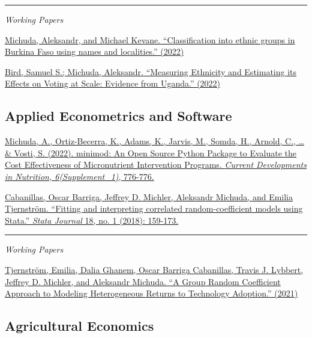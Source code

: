 \documentclass[
  11pt]{article}
\begin{document}
\begin{center}\rule{0.5\linewidth}{0.5pt}\end{center}

\emph{Working Papers}

\href{https://drive.google.com/file/d/1ZCS0c89GkS4hio5WEUrMSnqJ1FYeMd0V/view?usp=sharing}{Michuda,
Aleksandr, and Michael Kevane. ``Classification into ethnic groups in
Burkina Faso using names and localities.'' (2022)}

\href{https://drive.google.com/file/d/1Tdmr2_4DCSXIt_Q7tq1omglsgn249VgE/view?usp=sharing}{Bird,
Samuel S.; Michuda, Aleksandr. ``Measuring Ethnicity and Estimating its
Effects on Voting at Scale: Evidence from Uganda.'' (2022)}

\hypertarget{applied-econometrics-and-software}{%
\subsection{Applied Econometrics and
Software}\label{applied-econometrics-and-software}}

\href{https://academic.oup.com/cdn/article/6/Supplement_1/776/6606969}{Michuda,
A., Ortiz-Becerra, K., Adams, K., Jarvis, M., Somda, H., Arnold, C.,
\ldots{} \& Vosti, S. (2022). minimod: An Open Source Python Package to
Evaluate the Cost Effectiveness of Micronutrient Intervention Programs.
\emph{Current Developments in Nutrition, 6(Supplement\_1)}, 776-776.}

\href{https://journals.sagepub.com/doi/abs/10.1177/1536867X1801800109}{Cabanillas,
Oscar Barriga, Jeffrey D. Michler, Aleksandr Michuda, and Emilia
Tjernström. ``Fitting and interpreting correlated random-coefficient
models using Stata.'' \emph{Stata Journal} 18, no. 1 (2018): 159-173.}

\begin{center}\rule{0.5\linewidth}{0.5pt}\end{center}

\emph{Working Papers}

\href{https://emiliatjernstrom.com/files/TGBLMM2020.pdf}{Tjernström,
Emilia, Dalia Ghanem, Oscar Barriga Cabanillas, Travis J. Lybbert,
Jeffrey D. Michler, and Aleksandr Michuda. ``A Group Random Coefficient
Approach to Modeling Heterogeneous Returns to Technology Adoption.''
(2021)}

\hypertarget{agricultural-economics}{%
\subsection{Agricultural Economics}\label{agricultural-economics}}
\end{document}
